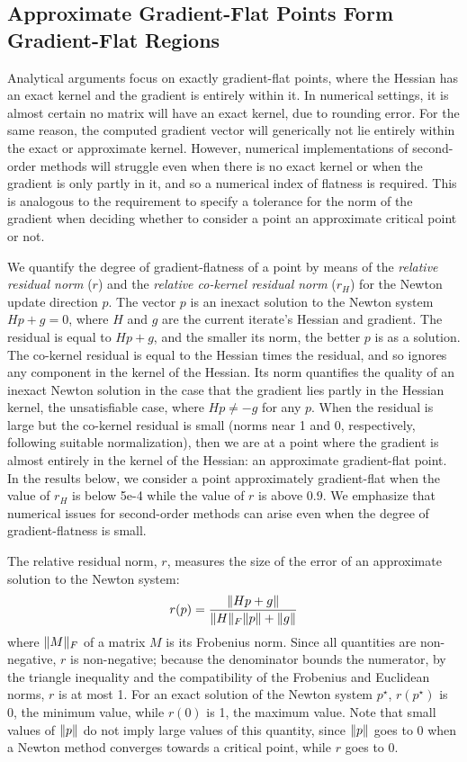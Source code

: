 \documentclass[../../thesis.tex]{subfiles}
\begin{document}
\subsection{Approximate Gradient-Flat Points Form Gradient-Flat Regions}%
Analytical arguments focus on exactly gradient-flat points,
where the Hessian has an exact kernel
and the gradient is entirely within it.
In numerical settings,
it is almost certain no matrix will have an exact kernel,
due to rounding error.
For the same reason, the computed gradient vector will generically not lie entirely
within the exact or approximate kernel.
However, numerical implementations of second-order methods
will struggle even when there is no exact kernel
or when the gradient is only partly in it,
and so a numerical index of flatness is required.
This is analogous to the requirement to specify a tolerance
for the norm of the gradient when deciding whether to consider a point
an approximate critical point or not.

We quantify the degree of gradient-flatness of a point
by means of
the \emph{relative residual norm} ($r$)
and the \emph{relative co-kernel residual norm} ($r_H$)
for the Newton update direction $p$.
The vector $p$ is an inexact solution to the Newton system $Hp + g = 0$,
where $H$ and $g$ are the current iterate's Hessian and gradient.
The residual is equal to $Hp + g$,
and the smaller its norm, the better $p$ is as a solution.
The co-kernel residual is equal to the Hessian times the residual,
and so ignores any component in the kernel of the Hessian.
Its norm quantifies the quality of an inexact Newton solution
in the case that the gradient lies partly in the Hessian kernel,
the unsatisfiable case, where $Hp \neq -g$ for any $p$.
When the residual is large but the co-kernel residual is small
(norms near 1 and 0, respectively, following suitable normalization),
then we are at a point where
the gradient is almost entirely in the kernel of the Hessian:
an approximate gradient-flat point.
In the results below, we consider a point approximately gradient-flat
when the value of $r_H$ is below 5e-4
while the value of $r$ is above $0.9$.
We emphasize that numerical issues for second-order methods
can arise even when the degree of gradient-flatness
is small.

The relative residual norm, $r$,
measures the size of the error
of an approximate solution to the Newton system:
\begin{equation}
    r(p) = \frac{\lVert Hp + g\rVert}{\lVert H\rVert_F \lVert p\rVert + \lVert g\rVert}
\end{equation}
\noindent where $\lVert M\rVert_F$ of a matrix $M$ is its Frobenius norm.
Since all quantities are non-negative,
$r$ is non-negative;
because the denominator bounds the numerator,
by the triangle inequality and the compatibility
of the Frobenius and Euclidean norms,
$r$ is at most 1.
For an exact solution of the Newton system $p^\star$,
$r(p^\star)$ is 0, the minimum value,
while $r(0)$ is 1, the maximum value.
Note that small values of $\lVert p\rVert$
do not imply large values of this quantity,
since $\lVert p\rVert$ goes to 0 when a Newton method
converges towards a critical point,
while $r$ goes to 0.
\end{document}
